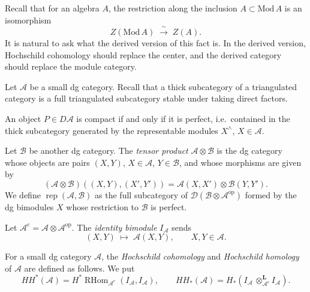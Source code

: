 \documentclass[12pt]{article}
\begin{document}
Recall that for an algebra \(A\), the restriction along the inclusion 
\(A \subset \mathrm{Mod}\,A\) is an isomorphism
\[
  Z(\mathrm{Mod}\,A) \;\xrightarrow{\;\sim\;}\; Z(A).
\]
It is natural to ask what the derived version of this fact is.  
In the derived version, Hochschild cohomology should replace the center, and the derived category should replace the module category. 

Let $\mathcal{A}$ be a small dg category. Recall that a thick subcategory of a triangulated category is a full triangulated subcategory stable under taking direct factors.

\begin{proposition}[cf.\ Proposition~1.6.9]
An object \(P \in D\mathcal{A}\) is compact if and only if it is perfect, i.e.\ contained in the thick subcategory generated by the representable modules \(X^{\wedge}\), \(X\in\mathcal{A}\).
\end{proposition}

Let \(\mathcal{B}\) be another dg category.  
The \emph{tensor product} \(\mathcal{A}\otimes \mathcal{B}\) is the dg category whose objects are pairs \((X,Y)\), \(X\in\mathcal{A}\), \(Y\in\mathcal{B}\), and whose morphisms are given by
\[
  (\mathcal{A}\otimes\mathcal{B})((X,Y),(X',Y')) 
  = \mathcal{A}(X,X') \otimes \mathcal{B}(Y,Y').
\]
We define \(\operatorname{rep}(\mathcal{A},\mathcal{B})\) as the full subcategory of 
\(\mathcal{D}(\mathcal{B}\otimes \mathcal{A}^{\mathrm{op}})\)
formed by the dg bimodules \(X\) whose restriction to \(\mathcal{B}\) is perfect.

\medskip

Let \(\mathcal{A}^e = \mathcal{A} \otimes \mathcal{A}^{\mathrm{op}}\).  
The \emph{identity bimodule} \(I_{\mathcal{A}}\) sends
\[
(X,Y) \;\longmapsto\; \mathcal{A}(X,Y), \qquad X,Y\in\mathcal{A}.
\]

\begin{definition}
For a small dg category \(\mathcal{A}\),  the \emph{Hochschild cohomology} and \emph{Hochschild homology} of \(\mathcal{A}\) are defined as follows. We put
\[
  HH^{*}(\mathcal{A}) = H^{*}\!\operatorname{RHom}_{\mathcal{A}^e}(I_{\mathcal{A}}, I_{\mathcal{A}}),
  \qquad
  HH_{*}(\mathcal{A}) = H_{*}(I_{\mathcal{A}} \,\otimes^{\mathbf{L}}_{\mathcal{A}^e}\! I_{\mathcal{A}}).
\]
\end{definition}
\end{document}
